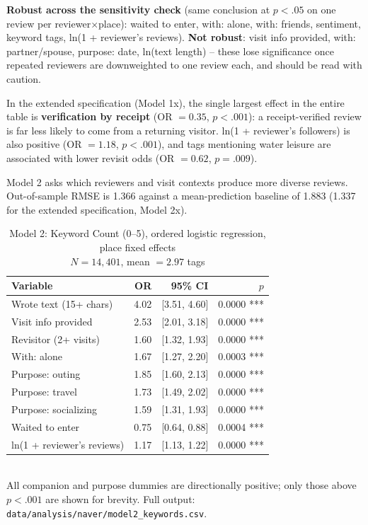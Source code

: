 \documentclass[10pt,a4paper]{article}
\newcommand{\subsect}[1]{\vspace{6pt}\noindent{\large\bfseries #1}\par\vspace{2pt}}
\begin{document}
\textbf{Robust across the sensitivity check} (same conclusion at $p<.05$ on
one review per reviewer$\times$place): waited to enter, with: alone, with:
friends, sentiment, keyword tags, ln(1 + reviewer's reviews). \textbf{Not
robust}: visit info provided, with: partner/spouse, purpose: date, ln(text
length) -- these lose significance once repeated reviewers are downweighted
to one review each, and should be read with caution.

In the extended specification (Model 1x), the single largest effect in the
entire table is \textbf{verification by receipt} (OR $= 0.35$, $p<.001$): a
receipt-verified review is far less likely to come from a returning visitor.
ln(1 + reviewer's followers) is also positive (OR $=1.18$, $p<.001$), and
tags mentioning water leisure are associated with lower revisit odds (OR
$=0.62$, $p=.009$).

\subsect{4.2 Keyword Diversity (Model 2)}
Model 2 asks which reviewers and visit contexts produce more diverse
reviews. Out-of-sample RMSE is 1.366 against a mean-prediction baseline of
1.883 (1.337 for the extended specification, Model 2x).

\begin{table}[H]\centering
\caption{Model 2: Keyword Count (0--5), ordered logistic regression, place fixed effects\\
\footnotesize $N = 14{,}401$, mean $= 2.97$ tags}
\footnotesize
\begin{tabular}{@{}lrrr@{}}
\toprule
Variable & OR & 95\% CI & $p$ \\
\midrule
Wrote text (15+ chars)     & 4.02 & [3.51, 4.60] & 0.0000 *** \\
Visit info provided         & 2.53 & [2.01, 3.18] & 0.0000 *** \\
Revisitor (2+ visits)        & 1.60 & [1.32, 1.93] & 0.0000 *** \\
With: alone                 & 1.67 & [1.27, 2.20] & 0.0003 *** \\
Purpose: outing              & 1.85 & [1.60, 2.13] & 0.0000 *** \\
Purpose: travel               & 1.73 & [1.49, 2.02] & 0.0000 *** \\
Purpose: socializing          & 1.59 & [1.31, 1.93] & 0.0000 *** \\
Waited to enter               & 0.75 & [0.64, 0.88] & 0.0004 *** \\
ln(1 + reviewer's reviews)  & 1.17 & [1.13, 1.22] & 0.0000 *** \\
\bottomrule
\end{tabular}
\\[3pt]
{\scriptsize All companion and purpose dummies are directionally positive; only those above $p<.001$ are shown for brevity. Full output: \texttt{data/analysis/naver/model2\_keywords.csv}.}
\end{table}
\end{document}

